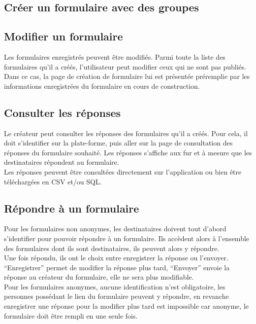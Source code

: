\documentclass{sigplanconf}
\begin{document}
\subsection{Créer un formulaire avec des groupes}

\subsection{Modifier un formulaire}
Les formulaires enregistrés peuvent être modifiés. Parmi toute la liste des formulaires qu’il a créés, l’utilisateur peut modifier ceux qui ne sont pas publiés. Dans ce cas, la page de création de formulaire lui est présentée préremplie par les informations enregistrées du formulaire en cours de construction. 

\subsection{Consulter les réponses}
Le créateur peut consulter les réponses des formulaires qu’il a créés. Pour cela, il doit s’identifier sur la plate-forme, puis aller sur la page de consultation des réponses du formulaire souhaité. Les réponses s’affiche aux fur et à mesure que les destinataires répondent au formulaire.\\
Les réponses peuvent être consultées directement sur l’application ou bien être téléchargées en CSV et/ou SQL.\\

\subsection{Répondre à un formulaire}
Pour les formulaires non anonymes, les destinataires doivent tout d’abord s’identifier pour pouvoir répondre à un formulaire. Ils accèdent alors à l’ensemble des formulaires dont ils sont destinataires, ils peuvent alors y répondre. \\
Une fois répondu, ils ont le choix entre enregistrer la réponse ou l'envoyer. “Enregistrer” permet de modifier la réponse plus tard, “Envoyer” envoie la réponse au créateur du formulaire, elle ne sera plus modifiable.\\
Pour les formulaires anonymes, aucune identification n’est obligatoire, les personnes possédant le lien du formulaire peuvent y répondre, en revanche enregistrer une réponse pour la modifier plus tard est impossible car anonyme, le formulaire doit être rempli en une seule fois.
\end{document}
